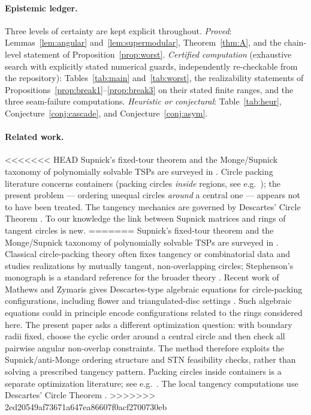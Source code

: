 \documentclass[11pt]{article}
\theoremstyle{definition}
\theoremstyle{remark}
\begin{document}
\paragraph{Epistemic ledger.}
Three levels of certainty are kept explicit throughout. \emph{Proved}: Lemmas~\ref{lem:angular} and~\ref{lem:supermodular}, Theorem~\ref{thm:A}, and the chain-level statement of Proposition~\ref{prop:worst}. \emph{Certified computation} (exhaustive search with explicitly stated numerical guards, independently re-checkable from the repository): Tables~\ref{tab:main} and~\ref{tab:worst}, the realizability statements of Propositions~\ref{prop:break1}--\ref{prop:break3} on their stated finite ranges, and the three seam-failure computations. \emph{Heuristic or conjectural}: Table~\ref{tab:heur}, Conjecture~\ref{conj:cascade}, and Conjecture~\ref{conj:asym}.

\paragraph{Related work.}
<<<<<<< HEAD
Supnick's fixed-tour theorem \cite{supnick} and the Monge/Supnick taxonomy of polynomially solvable TSPs are surveyed in \cite{bdvvw}. Circle packing literature concerns containers (packing circles \emph{inside} regions, see e.g.\ \cite{hifi}); the present problem --- ordering unequal circles \emph{around} a central one --- appears not to have been treated. The tangency mechanics are governed by Descartes' Circle Theorem \cite{mathews-zymaris-spinors}. To our knowledge the link between Supnick matrices and rings of tangent circles is new.
=======
Supnick's fixed-tour theorem \cite{supnick} and the Monge/Supnick taxonomy of polynomially solvable TSPs are surveyed in \cite{bdvvw}. Classical circle-packing theory often fixes tangency or combinatorial data and studies realizations by mutually tangent, non-overlapping circles; Stephenson's monograph is a standard reference for the broader theory \cite{stephenson}. Recent work of Mathews and Zymaris gives Descartes-type algebraic equations for circle-packing configurations, including flower and triangulated-disc settings \cite{mathews-zymaris-spinors,mathews-zymaris-algebraic}. Such algebraic equations could in principle encode configurations related to the rings considered here. The present paper asks a different optimization question: with boundary radii fixed, choose the cyclic order around a central circle and then check all pairwise angular non-overlap constraints. The method therefore exploits the Supnick/anti-Monge ordering structure and STN feasibility checks, rather than solving a prescribed tangency pattern. Packing circles inside containers is a separate optimization literature; see e.g.\ \cite{hifi}. The local tangency computations use Descartes' Circle Theorem \cite{descartes-ref}.
>>>>>>> 2ed20549af73671a647ea86607f0acf2700730eb
\end{document}
